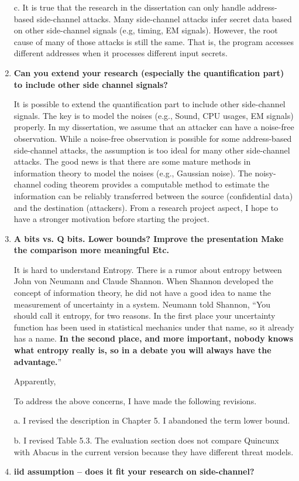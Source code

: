 \documentclass{article}
\begin{document}
\begin{enumerate}
c. It is true that the research in the dissertation can only handle address-based side-channel attacks. Many side-channel attacks infer secret data based on other side-channel signals (e.g, timing, EM signals). However, the root cause of many of those attacks is still the same. That is, the program accesses different addresses when it processes different input secrets.

\item \textbf{Can you extend your research (especially the quantification part) to include other side channel signals?}

It is possible to extend the quantification part to include other side-channel signals. The key is to model the noises (e.g., Sound, CPU usages, EM signals) properly. In my dissertation, we assume that an attacker can have a noise-free observation. While a noise-free observation is possible for some address-based side-channel attacks, the assumption is too ideal for many other side-channel attacks. The good news is that there are some mature methods in information theory to model the noises (e.g., Gaussian noise). The noisy-channel coding theorem provides a computable method to estimate the information can be reliably transferred between the source (confidential data) and the destination (attackers). From a research project aspect, I hope to have a stronger motivation before starting the project. 
\item \textbf{A bits vs. Q bits. Lower bounds?
       Improve the presentation
       Make the comparison more meaningful
       Etc.}

It is hard to understand Entropy. There is a rumor about entropy between John von Neumann and Claude Shannon. When Shannon developed the concept of information theory, he did not have a good idea to name the measurement of uncertainty in a system. Neumann told Shannon, ``You should call it entropy, for two reasons. In the first place your uncertainty function has been used in statistical mechanics under that name, so it already has a name. \textbf{In the second place, and more important, nobody knows what entropy really is, so in a debate you will always have the advantage.}''

Apparently,        
       
To address the above concerns, I have made the following revisions.

a. I revised the description in Chapter 5. I abandoned the term lower bound.

b. I revised Table 5.3. The evaluation section does not compare Quincunx with Abacus in the current version because they have different threat models.
\item \textbf{iid assumption – does it fit your research on side-channel?}


\end{enumerate}
\end{document}
